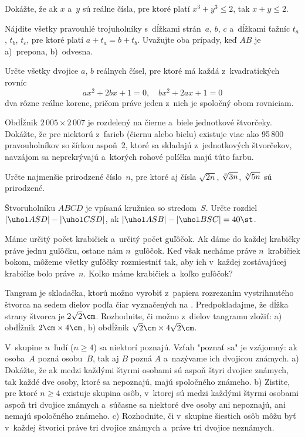 {%
Dokážte, že ak $x$ a~$y$ sú reálne čísla, pre ktoré platí $x^3+y^3\le2$,
tak $x+y\le2$.}

{%
Nájdite všetky pravouhlé trojuholníky s~dĺžkami strán~$a$, $b$,
$c$ a~dĺžkami ťažníc $t_a$, $t_b$, $t_c$, pre ktoré platí
$a+t_a=b+t_b$. Uvažujte oba prípady, keď $AB$ je a)~prepona, b)~odvesna.}

{%
Určte všetky dvojice $a$, $b$ reálnych čísel, pre ktoré má každá
z~kvadratických rovníc
$$
ax^2+2bx+1=0,\quad bx^2+2ax+1=0
$$
dva rôzne reálne korene, pričom práve jeden z~nich je spoločný obom rovniciam.}

{%
Obdĺžnik $2\,005\times2\,007$ je rozdelený na čierne a~biele
jednotkové štvorčeky. Dokážte, že pre niektorú z~farieb (čiernu alebo bielu)
existuje viac ako
95\,800 pravouholníkov so šírkou aspoň~2, ktoré sa skladajú
z~jednotkových štvorčekov, navzájom sa neprekrývajú a~ktorých rohové
políčka majú túto farbu.}

{%
Určte najmenšie prirodzené číslo~$n$, pre ktoré aj čísla
$\sqrt{2n}$, $\root3\of{3n}$, $\root5\of{5n}$
sú prirodzené.}

{%
Štvoruholníku $ABCD$ je vpísaná kružnica so stredom~$S$.
Určte rozdiel $|\uhol ASD|-|\uhol CSD|$, ak $|\uhol ASB|-|\uhol BSC|=40\st$.}

{%
Máme určitý počet krabičiek a~určitý počet guľôčok. Ak dáme do
každej krabičky práve jednu guľôčku, ostane nám $n$~guľôčok. Keď však
necháme práve $n$~krabičiek bokom, môžeme všetky guľôčky
rozmiestniť tak, aby ich v~každej zostávajúcej krabičke bolo práve~$n$.
Koľko máme krabičiek a~koľko guľôčok?}

{%
Tangram je skladačka, ktorú možno vyrobiť z~papiera rozrezaním
vystrihnutého štvorca na sedem dielov podľa čiar vyznačených na
%
\obr. Predpokladajme, že dĺžka strany štvorca je
$2\sqrt2\cm$. Rozhodnite, či možno z~dielov tangramu zložiť:
\ite a) obdĺžnik $2\cm\times4\cm$,
\ite b) obdĺžnik $\sqrt2\cm\times4\sqrt2\cm$.}

{%
V~skupine $n$~ľudí ($n\ge4$) sa niektorí poznajú.
Vzťah "poznať sa" je vzájomný: ak osoba~$A$ pozná
osobu~$B$, tak aj $B$ pozná $A$ a~nazývame ich dvojicou známych.
\ite a) Dokážte, že ak medzi každými štyrmi osobami sú aspoň štyri dvojice známych,
        tak každé dve osoby, ktoré sa nepoznajú, majú spoločného známeho.
\ite b) Zistite, pre ktoré $n\geq4$ existuje skupina osôb, v~ktorej sú
        medzi každými štyrmi osobami aspoň tri dvojice známych a~súčasne
        sa niektoré dve osoby ani nepoznajú, ani nemajú spoločného známeho.
\ite c) Rozhodnite, či v~skupine šiestich osôb môžu byť v~každej štvorici práve
        tri dvojice známych a~práve tri dvojice neznámych.

   }

